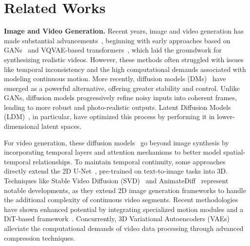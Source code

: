 \section{Related Works}
\label{sec:relate}


\noindent\textbf{Image and Video Generation.} Recent years, image and video generation has made substantial advancements~\cite{vondrick2016generating, ge2022long, bar2023multidiffusion, zeng2024make}, beginning with early approaches based on GANs~\cite{goodfellow2014generative, chan2019everybody, ren2020deep, siarohin2019animating, siarohin2021motion} and VQVAE-based transformers~\cite{ge2022long, xu2016msr, sun2024autoregressive}, which laid the groundwork for synthesizing realistic videos. However, these methods often struggled with issues like temporal inconsistency and the high computational demands associated with modeling continuous motion. More recently, diffusion models (DMs)~\cite{song2020denoising, ho2020denoising, ni2023conditional} have emerged as a powerful alternative, offering greater stability and control. Unlike GANs, diffusion models progressively refine noisy inputs into coherent frames, leading to more robust and photo-realistic outputs. Latent Diffusion Models (LDM)~\cite{rombach2022high}, in particular, have optimized this process by performing it in lower-dimensional latent spaces. %

For video generation, these diffusion models~\cite{guo2023animatediff, bar2024lumiere} go beyond image synthesis by incorporating temporal layers and attention mechanisms to better model spatial-temporal relationships. To maintain temporal continuity, some approaches~\cite{singer2022make,blattmann2023stable, zhou2022magicvideo, wang2023dreamvideo} directly extend the 2D U-Net~\cite{ronneberger2015u}, pre-trained on text-to-image tasks into 3D. Techniques like Stable Video Diffusion (SVD)~\cite{blattmann2023stable} and AnimateDiff~\cite{guo2023animatediff} represent notable developments, as they extend 2D image generation frameworks to handle the additional complexity of continuous video segments. Recent methodologies~\cite{xu2024easyanimate, yang2024cogvideox, openai2024sora, zhang2024tora} have shown enhanced potential by integrating specialized motion modules and a DiT-based framework~\cite{peebles2023scalable}. Concurrently, 3D Variational Autoencoders (VAEs)~\cite{kingma2013auto} alleviate the computational demands of video data processing through advanced compression techniques. %

